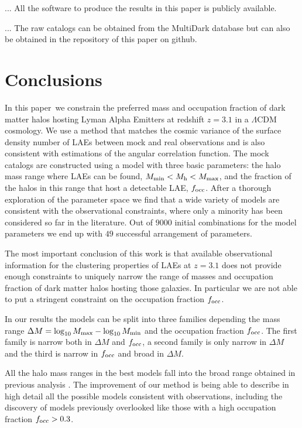 \documentclass[usenatbib]{mn2e}
\newcommand{\documentname}{paper~}
\begin{document}
... All the software to produce the results in this paper is publicly
available. 

... The raw catalogs can be obtained from the MultiDark database but
can also be obtained in the repository of this paper on github.

\section{Conclusions}
\label{sec:conclusions}

In this \documentname we constrain the preferred mass
and occupation fraction of dark matter halos hosting Lyman Alpha Emitters at
redshift $z=3.1$ in a $\Lambda$CDM cosmology. We use a method that
matches the cosmic variance of the surface 
density number of LAEs between mock and real observations and is also
consistent with estimations of the angular
correlation function. The mock catalogs are constructed using a 
model with three basic parameters: the halo mass range where LAEs can
be found, $M_{\rm   min}<M_{\rm h}<M_{\rm   max}$, and the fraction of
the halos in this range that host a detectable LAE, $f_{\rm occ}$. After
a thorough exploration of the parameter space we find that a wide
variety of models are consistent with the observational constraints,
where only a minority has been considered so far in the
literature. Out of $9000$ initial combinations for the model
parameters we end up with $49$ successful arrangement of parameters.


The most important conclusion of this work is that available
observational information for the clustering properties of LAEs at
$z=3.1$ does not provide enough constraints to uniquely narrow the range of masses
and occupation fraction of dark matter halos hosting those
galaxies. In particular we are not able to put a stringent constraint
on the occupation fraction $f_{\rm occ}$.

In our results the models can be split into three families
depending the mass range $\Delta M=\log_{10}M_{\rm max} -
\log_{10}M_{\rm min}$ and the occupation fraction $f_{\rm occ}$. The first family is narrow both in
$\Delta M$ and $f_{\rm occ}$, a second family is only narrow in
$\Delta M$ and the third is narrow in $f_{\rm occ}$ and broad in
$\Delta M$. 


All the halo mass ranges in the best models fall into the broad
range obtained in previous analysis \citep{Gawiser2007}. The
improvement of our method is being able to describe in high detail
all the possible models consistent with observations, including the
discovery of models previously overlooked like those with a high
occupation fraction $f_{\rm occ}>0.3$.
 
\end{document}
